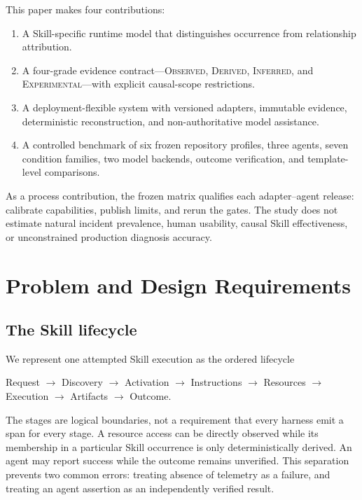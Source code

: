 \documentclass[runningheads]{llncs}
\newcommand{\observed}{\textsc{Observed}\xspace}
\newcommand{\derived}{\textsc{Derived}\xspace}
\newcommand{\inferred}{\textsc{Inferred}\xspace}
\newcommand{\experimental}{\textsc{Experimental}\xspace}
\begin{document}
This paper makes four contributions:

\begin{enumerate}
  \item A Skill-specific runtime model that distinguishes occurrence from
  relationship attribution.
  \item A four-grade evidence contract---\observed, \derived, \inferred, and
  \experimental---with explicit causal-scope restrictions.
  \item A deployment-flexible system with versioned adapters, immutable
  evidence, deterministic reconstruction, and non-authoritative model
  assistance.
  \item A controlled benchmark of six frozen repository profiles, three agents,
  seven condition families, two model backends, outcome verification, and
  template-level comparisons.
\end{enumerate}

As a process contribution, the frozen matrix qualifies each adapter--agent
release: calibrate capabilities, publish limits, and rerun the gates. The study
does not estimate natural incident prevalence, human usability, causal Skill
effectiveness, or unconstrained production diagnosis accuracy.

\section{Problem and Design Requirements}

\subsection{The Skill lifecycle}

We represent one attempted Skill execution as the ordered lifecycle

\begin{center}
\small
Request $\rightarrow$ Discovery $\rightarrow$ Activation $\rightarrow$
Instructions $\rightarrow$ Resources $\rightarrow$ Execution $\rightarrow$
Artifacts $\rightarrow$ Outcome.
\end{center}

The stages are logical boundaries, not a requirement that every harness emit a
span for every stage.  A resource access can be directly observed while its
membership in a particular Skill occurrence is only deterministically derived.
An agent may report success while the outcome remains unverified.  This
separation prevents two common errors: treating absence of telemetry as a
failure, and treating an agent assertion as an independently verified result.
\end{document}
